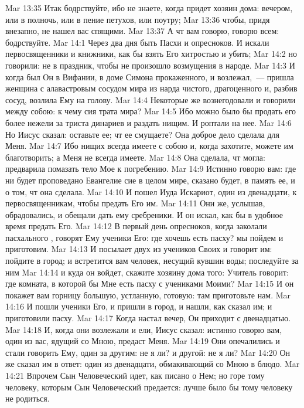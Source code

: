 \vs Mar 13:35 Итак бодрствуйте, ибо не знаете, когда придет хозяин дома: вечером, или в полночь, или в пение петухов, или поутру;
\vs Mar 13:36 чтобы, придя внезапно, не нашел вас спящими.
\vs Mar 13:37 А чт вам говорю, говорю всем: бодрствуйте.
\vs Mar 14:1 Через два дня  быть  Пасхи и опресноков. И искали первосвященники и книжники, как бы взять Его хитростью и убить;
\vs Mar 14:2 но говорили:  не в праздник, чтобы не произошло возмущения в народе.
\rsbpar\vs Mar 14:3 И когда был Он в Вифании, в доме Симона прокаженного, и возлежал,~--- пришла женщина с алавастровым сосудом мира из нарда чистого, драгоценного и, разбив сосуд, возлила Ему на голову.
\vs Mar 14:4 Некоторые же вознегодовали и говорили между собою: к чему сия трата мира?
\vs Mar 14:5 Ибо можно было бы продать его более нежели за триста динариев и раздать нищим. И роптали на нее.
\vs Mar 14:6 Но Иисус сказал: оставьте ее; чт ее смущаете? Она доброе дело сделала для Меня.
\vs Mar 14:7 Ибо нищих всегда имеете с собою и, когда захотите, можете им благотворить; а Меня не всегда имеете.
\vs Mar 14:8 Она сделала, чт могла: предварила помазать тело Мое к погребению.
\vs Mar 14:9 Истинно говорю вам: где ни будет проповедано Евангелие сие в целом мире, сказано будет, в память ее, и о том, чт она сделала.
\rsbpar\vs Mar 14:10 И пошел Иуда Искариот, один из двенадцати, к первосвященникам, чтобы предать Его им.
\vs Mar 14:11 Они же, услышав, обрадовались, и обещали дать ему сребреники. И он искал, как бы в удобное время предать Его.
\rsbpar\vs Mar 14:12 В первый день опресноков, когда заколали пасхального , говорят Ему ученики Его: где хочешь есть пасху? мы пойдем и приготовим.
\vs Mar 14:13 И посылает двух из учеников Своих и говорит им: пойдите в город; и встретится вам человек, несущий кувшин воды; последуйте за ним
\vs Mar 14:14 и куда он войдет, скажите хозяину дома того: Учитель говорит: где комната, в которой бы Мне есть пасху с учениками Моими?
\vs Mar 14:15 И он покажет вам горницу большую, устланную, готовую: там приготовьте нам.
\vs Mar 14:16 И пошли ученики Его, и пришли в город, и нашли, как сказал им; и приготовили пасху.
\vs Mar 14:17 Когда настал вечер, Он приходит с двенадцатью.
\vs Mar 14:18 И, когда они возлежали и ели, Иисус сказал: истинно говорю вам, один из вас, ядущий со Мною, предаст Меня.
\vs Mar 14:19 Они опечалились и стали говорить Ему, один за другим: не я ли? и другой: не я ли?
\vs Mar 14:20 Он же сказал им в ответ: один из двенадцати, обмакивающий со Мною в блюдо.
\vs Mar 14:21 Впрочем Сын Человеческий идет, как писано о Нем; но горе тому человеку, которым Сын Человеческий предается: лучше было бы тому человеку не родиться.
